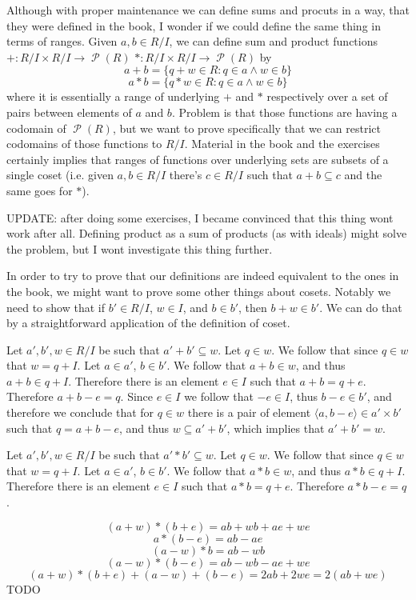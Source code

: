 \documentclass[11pt,oneside,titlepage]{book}
\DeclareMathOperator \pow {\mathcal {P}}
\newcommand{\eangle}[1]{\langle #1 \rangle}
\newcommand{\set}[1]{\{ #1 \}}
\begin{document}
Although with proper maintenance we can define sums and procuts
in a way, that they were defined in the book, I wonder if we could
define the same thing in terms of ranges. 
Given $a, b \in R/I$, we can define sum and
product functions $+: R/I \times R/I \to \pow(R)$
$*: R/I \times R/I \to \pow(R)$ by
$$a + b = \set{q + w \in R: q \in a \land w \in b}$$
$$a * b = \set{q * w \in R: q \in a \land w \in b}$$
where it is essentially a range of underlying $+$ and $*$ respectively
over a set of pairs between elements of $a$ and $b$. Problem is that
those functions are having a codomain of $\pow(R)$, but we want to
prove specifically that we can restrict codomains of those functions
to $R/I$. Material in the book and the exercises certainly implies
that ranges of functions over underlying sets are subsets of
a single coset (i.e. given $a, b \in R/I$ there's $c \in R/I$
such that $a + b \subseteq c$ and the same goes for $*$).

UPDATE: after doing some exercises, I became convinced that this thing
wont work after all. Defining product as a sum of products (as with
ideals) might solve the problem, but I wont investigate this thing
further. 

In order to try to prove that our definitions are indeed equivalent to
the ones in the book, we might want to prove some other things about
cosets. Notably we need to show that if $b' \in R/I$, $w \in I$, and
$b \in b'$, then $b + w \in b'$. We can do that by a straightforward
application of the definition of coset.

Let $a', b', w \in R/I$ be such that $a' + b' \subseteq w$. Let $q \in w$.
We follow that since $q \in w$ that $w = q + I$. Let $a \in a'$, $b \in b'$.
We follow that $a + b \in w$, and thus $a + b \in q + I$. Therefore
there is an element $e \in I$ such that $a + b = q + e$. Therefore
$a + b - e = q$. Since $e \in I$ we follow that $-e \in I$, thus
$b - e \in b'$, and therefore we conclude that for $q \in w$ there
is a pair of element $\eangle{a, b - e} \in a' \times b'$ such that
$q = a + b - e$, and thus $w \subseteq a' + b'$, which implies that
$a' + b' = w$.

Let $a', b', w \in R/I$ be such that $a' * b' \subseteq w$. Let $q \in w$.
We follow that since $q \in w$ that $w = q + I$. Let $a \in a'$, $b \in b'$.
We follow that $a * b \in w$, and thus $a * b \in q + I$. Therefore
there is an element $e \in I$ such that $a * b = q + e$. Therefore
$a * b - e = q$.

$$(a + w) * (b + e) = ab + wb + ae + we$$
$$a * (b - e) = ab - ae$$
$$(a - w) * b = ab - wb$$
$$(a - w) * (b - e) = ab - wb - ae + we$$
$$(a + w) * (b + e) + (a - w) + (b - e) = 2ab + 2we = 2(ab + we)$$
TODO
\end{document}
